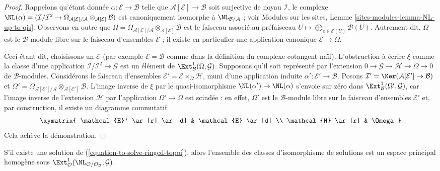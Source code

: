 \begin{proof}
Rappelons qu'étant donnée $\alpha : \mathcal{E} \to \mathcal{B}$ telle que
$\mathcal{A}[\mathcal{E}] \to \mathcal{B}$ soit surjective de noyau
$\mathcal{I}$, le complexe
$\NL(\alpha) = (\mathcal{I}/\mathcal{I}^2 \to 
\Omega_{\mathcal{A}[\mathcal{E}]/\mathcal{A}}
\otimes_{\mathcal{A}[\mathcal{E}]} \mathcal{B})$ est canoniquement isomorphe
à $\NL_{\mathcal{B}/\mathcal{A}}$ ; voir Modules sur les sites,
Lemme \ref{sites-modules-lemma-NL-up-to-qis}.
Observons en outre que
$\Omega = \Omega_{\mathcal{A}[\mathcal{E}]/\mathcal{A}}
\otimes_{\mathcal{A}[\mathcal{E}]} \mathcal{B}$ est le faisceau associé au
préfaisceau
$U \mapsto \bigoplus_{e \in \mathcal{E}(U)} \mathcal{B}(U)$.
Autrement dit, $\Omega$ est le $\mathcal{B}$-module libre sur le faisceau
d'ensembles $\mathcal{E}$ ; il existe en particulier une application
canonique $\mathcal{E} \to \Omega$.

\medskip\noindent
Ceci étant dit, choisissons un $\mathcal{E}$ (par exemple
$\mathcal{E} = \mathcal{B}$ comme dans la définition du complexe cotangent
naïf). L'obstruction à écrire $\xi$ comme la classe d'une application
$\mathcal{I}/\mathcal{I}^2 \to \mathcal{G}$ est un élément de
$\Ext^1_\mathcal{B}(\Omega, \mathcal{G})$. Supposons qu'il soit représenté par
l'extension $0 \to \mathcal{G} \to \mathcal{H} \to \Omega \to 0$ de
$\mathcal{B}$-modules. Considérons le faisceau d'ensembles
$\mathcal{E}' = \mathcal{E} \times_\Omega \mathcal{H}$, muni d'une application
induite $\alpha' : \mathcal{E}' \to \mathcal{B}$.
Posons $\mathcal{I}' = \Ker(\mathcal{A}[\mathcal{E}'] \to \mathcal{B})$ et
$\Omega' = \Omega_{\mathcal{A}[\mathcal{E}']/\mathcal{A}}
\otimes_{\mathcal{A}[\mathcal{E}']} \mathcal{B}$.
L'image inverse de $\xi$ par le quasi-isomorphisme
$\NL(\alpha') \to \NL(\alpha)$ s'envoie sur zéro dans
$\Ext^1_\mathcal{B}(\Omega', \mathcal{G})$, car l'image inverse de l'extension
$\mathcal{H}$ par l'application $\Omega' \to \Omega$ est scindée : en effet,
$\Omega'$ est le $\mathcal{B}$-module libre sur le faisceau d'ensembles
$\mathcal{E}'$ et, par construction, il existe un diagramme commutatif
$$
\xymatrix{
\mathcal{E}' \ar[r] \ar[d] & \mathcal{E} \ar[d] \\
\mathcal{H} \ar[r] & \Omega
}
$$
Cela achève la démonstration.
\end{proof}

\begin{lemma}
\label{lemma-choices-ringed-topoi}
S'il existe une solution de (\ref{equation-to-solve-ringed-topoi}), alors
l'ensemble des classes d'isomorphisme de solutions est un espace principal
homogène sous
$\Ext^1_\mathcal{O}(
\NL_{\mathcal{O}/\mathcal{O}_\mathcal{B}}, \mathcal{G})$.
\end{lemma}

